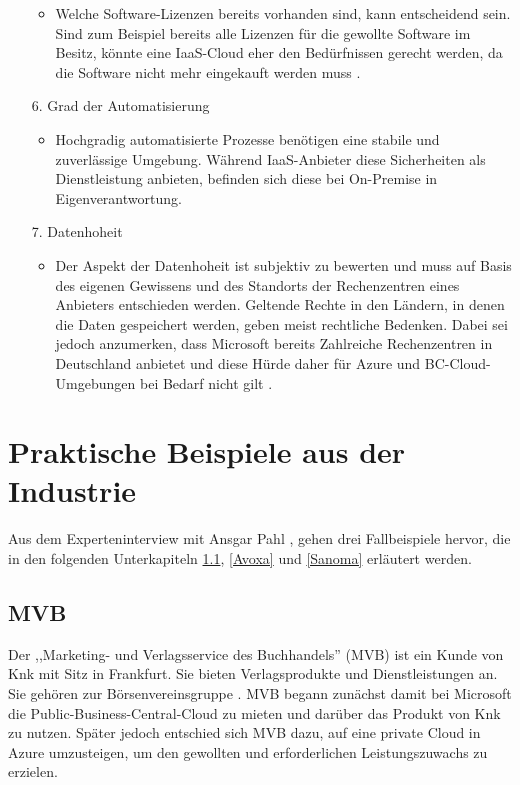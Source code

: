 \documentclass[12pt,bibtotoc]{article}
\begin{document}
\begin{itemize}
				\begin{itemize}
					\item Welche Software-Lizenzen bereits vorhanden sind, kann entscheidend sein. Sind zum Beispiel bereits alle Lizenzen für die gewollte Software im Besitz, könnte eine IaaS-Cloud eher den Bedürfnissen gerecht werden, da die Software nicht mehr eingekauft werden muss \cite{Anhang}.
				\end{itemize}
			\item[6.] Grad der Automatisierung
				\begin{itemize}
					\item Hochgradig automatisierte Prozesse benötigen eine stabile und zuverlässige Umgebung. Während IaaS-Anbieter diese Sicherheiten als Dienstleistung anbieten, befinden sich diese bei On-Premise in Eigenverantwortung. 
				\end{itemize}
			\item[7.] Datenhoheit 
				\begin{itemize}
					\item Der Aspekt der Datenhoheit ist subjektiv zu bewerten und muss auf Basis des eigenen Gewissens und des Standorts der Rechenzentren eines Anbieters entschieden werden. Geltende Rechte in den Ländern, in denen die Daten gespeichert werden, geben meist rechtliche Bedenken. Dabei sei jedoch anzumerken, dass Microsoft bereits Zahlreiche Rechenzentren in Deutschland anbietet und diese Hürde daher für Azure und BC-Cloud-Umgebungen bei Bedarf nicht gilt \cite{Microsoft-Rechenzentrum.2023}.
				\end{itemize}
		\end{itemize}
		\newpage
	\section{Praktische Beispiele aus der Industrie}
		Aus dem Experteninterview mit Ansgar Pahl \cite{Anhang}, gehen drei Fallbeispiele hervor, die in den folgenden Unterkapiteln \ref{MVB}, \ref{Avoxa} und \ref{Sanoma} erläutert werden.
			\subsection{MVB}\label{MVB}
			Der ,,Marketing- und Verlagsservice des Buchhandels'' (MVB) ist ein Kunde von Knk mit Sitz in Frankfurt. Sie bieten Verlagsprodukte und Dienstleistungen an. Sie gehören zur Börsenvereinsgruppe \cite{MVB-Website.2024}.\newline 
			MVB begann zunächst damit bei Microsoft die Public-Business-Central-Cloud zu mieten und darüber das Produkt von Knk zu nutzen. Später jedoch entschied sich MVB dazu, auf eine private Cloud in Azure umzusteigen, um den gewollten und erforderlichen Leistungszuwachs zu erzielen.
\end{document}
